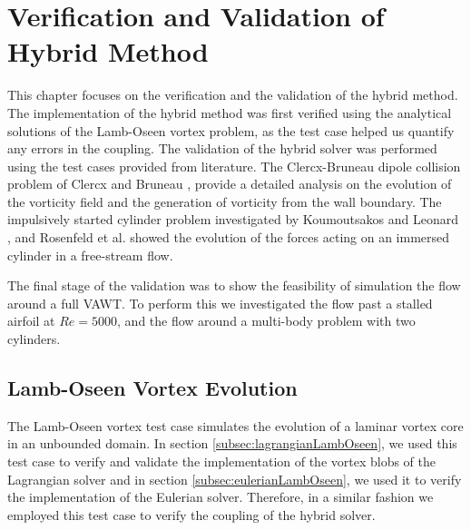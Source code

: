 \chapter{Verification and Validation of Hybrid Method}
\label{ch:vavohm}



This chapter focuses on the verification and the validation of the hybrid method. The implementation of the hybrid method was first verified using the analytical solutions of the Lamb-Oseen vortex problem, as the test case helped us quantify any errors in the coupling. The validation of the hybrid solver was performed using the test cases provided from literature. The Clercx-Bruneau dipole collision problem of Clercx and Bruneau \cite{Clercx2006a}, provide a detailed analysis on the evolution of the vorticity field and the generation of vorticity from the wall boundary. The impulsively started cylinder problem investigated by Koumoutsakos and Leonard \cite{Koumoutsakos1995a}, and Rosenfeld et al. \cite{MosheRosenFeldDochanKwak1991} showed the evolution of the forces acting on an immersed cylinder in a free-stream flow.

The final stage of the validation was to show the feasibility of simulation the flow around a full VAWT. To perform this we investigated the flow past a stalled airfoil at $Re=5000$, and the flow around a multi-body problem with two cylinders.

\section{Lamb-Oseen Vortex Evolution}
\label{sec:vvhm-love}
The Lamb-Oseen vortex test case simulates the evolution of a laminar vortex core in an unbounded domain. In section \ref{subsec:lagrangianLambOseen}, we used this test case to verify and validate the implementation of the vortex blobs of the Lagrangian solver and in section \ref{subsec:eulerianLambOseen}, we used it to verify the implementation of the Eulerian solver. Therefore, in a similar fashion we employed this test case to verify the coupling of the hybrid solver. 

